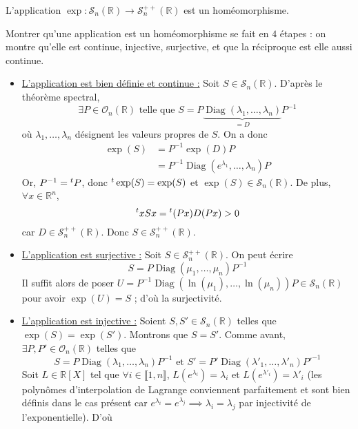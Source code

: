 	\begin{theorem}
		L'application $\exp : \mathcal{S}_n(\mathbb{R}) \rightarrow \mathcal{S}^{++}_n(\mathbb{R})$ est un homéomorphisme.
	\end{theorem}

	\begin{demonstration}
		Montrer qu'une application est un homéomorphisme se fait en $4$ étapes : on montre qu'elle est continue, injective, surjective, et que la réciproque est elle aussi continue.
		\begin{itemize}
			\item \underline{L'application est bien définie et continue :} Soit $S \in \mathcal{S}_n(\mathbb{R})$. D'après le théorème spectral,
			\[ \exists P \in \mathcal{O}_n(\mathbb{R}) \text{ telle que } S = P \underbrace{\operatorname{Diag}(\lambda_1, \dots, \lambda_n)}_{= D}P^{-1} \]
			où $\lambda_1, \dots, \lambda_n$ désignent les valeurs propres de $S$. On a donc
			\begin{align*}
				\exp(S) &= P^{-1} \exp(D) P \\
				&= P^{-1} \operatorname{Diag}(e^{\lambda_1}, \dots, \lambda_n) P
			\end{align*}
			Or, $P^{-1} = \mathstrut ^t P$, donc $\mathstrut ^t \exp(S) = \exp(S)$ et $\exp(S) \in \mathcal{S}_n(\mathbb{R})$. De plus, $\forall x \in \mathbb{R}^n$,
			\[ \mathstrut ^t x S x = \mathstrut ^t (Px) D (Px) > 0 \]
			car $D \in \mathcal{S}^{++}_n(\mathbb{R})$. Donc $S \in \mathcal{S}^{++}_n(\mathbb{R})$.
			\item \underline{L'application est surjective :} Soit $S \in \mathcal{S}^{++}_n(\mathbb{R})$. On peut écrire
			\[ S = P \operatorname{Diag}(\mu_1, \dots, \mu_n) P^{-1} \]
			Il suffit alors de poser $U = P^{-1} \operatorname{Diag}(\ln(\mu_1), \dots, \ln(\mu_n)) P \in \mathcal{S}_n(\mathbb{R})$ pour avoir $\exp(U) = S$ ; d'où la surjectivité.
			\item \underline{L'application est injective :} Soient $S, S' \in \mathcal{S}_n(\mathbb{R})$ telles que $\exp(S) = \exp(S')$. Montrons que $S = S'$. Comme avant, $\exists P, P' \in \mathcal{O}_n(\mathbb{R})$ telles que
			\[ S = P \operatorname{Diag}(\lambda_1, \dots, \lambda_n) P^{-1} \text{ et } S' = P' \operatorname{Diag}(\lambda'_1, \dots, \lambda'_n) P'^{-1} \]
			Soit $L \in \mathbb{R}[X]$ tel que $\forall i \in \llbracket 1, n \rrbracket$, $L(e^{\lambda_i}) = \lambda_i$ et $L(e^{\lambda'_i}) = \lambda'_i$ (les polynômes d'interpolation de Lagrange conviennent parfaitement et sont bien définis dans le cas présent car $e^{\lambda_i} = e^{\lambda_j} \implies \lambda_i = \lambda_j$ par injectivité de l'exponentielle). D'où

\end{itemize}
\end{demonstration}

